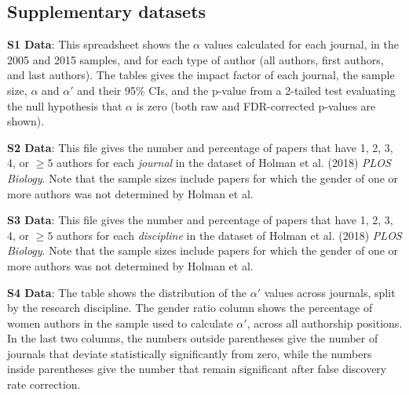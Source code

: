 \documentclass[12pt,]{article}
\begin{document}
\hypertarget{supplementary-datasets}{%
\subsection{Supplementary datasets}\label{supplementary-datasets}}

\textbf{S1 Data}: This spreadsheet shows the \(\alpha\) values
calculated for each journal, in the 2005 and 2015 samples, and for each
type of author (all authors, first authors, and last authors). The
tables gives the impact factor of each journal, the sample size,
\(\alpha\) and \(\alpha'\) and their 95\% CIs, and the p-value from a
2-tailed test evaluating the null hypothesis that \(\alpha\) is zero
(both raw and FDR-corrected p-values are shown).

\textbf{S2 Data}: This file gives the number and percentage of papers
that have 1, 2, 3, 4, or \({\ge}5\) authors for each \emph{journal} in
the dataset of Holman et al. (2018) \emph{PLOS Biology}. Note that the
sample sizes include papers for which the gender of one or more authors
was not determined by Holman et al.

\textbf{S3 Data}: This file gives the number and percentage of papers
that have 1, 2, 3, 4, or \({\ge}5\) authors for each \emph{discipline}
in the dataset of Holman et al. (2018) \emph{PLOS Biology}. Note that
the sample sizes include papers for which the gender of one or more
authors was not determined by Holman et al.

\textbf{S4 Data}: The table shows the distribution of the \(\alpha'\)
values across journals, split by the research discipline. The gender
ratio column shows the percentage of women authors in the sample used to
calculate \(\alpha'\), across all authorship positions. In the last two
columns, the numbers outside parentheses give the number of journals
that deviate statistically significantly from zero, while the numbers
inside parentheses give the number that remain significant after false
discovery rate correction.
\end{document}
